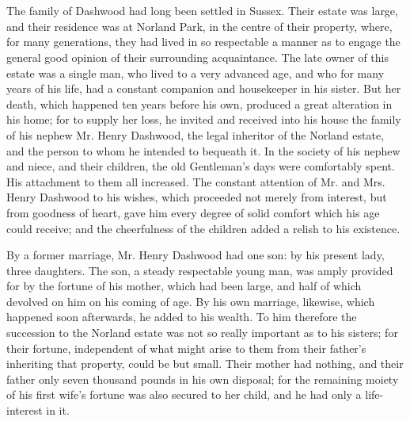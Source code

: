 \chapter{} %

The family of Dashwood had long been settled in Sussex. Their estate was large, and their residence was at Norland Park, in the centre of their property, where, for many generations, they had lived in so respectable a manner as to engage the general good opinion of their surrounding acquaintance. The late owner of this estate was a single man, who lived to a very advanced age, and who for many years of his life, had a constant companion and housekeeper in his sister. But her death, which happened ten years before his own, produced a great alteration in his home; for to supply her loss, he invited and received into his house the family of his nephew Mr. Henry Dashwood, the legal inheritor of the Norland estate, and the person to whom he intended to bequeath it. In the society of his nephew and niece, and their children, the old Gentleman's days were comfortably spent. His attachment to them all increased. The constant attention of Mr. and Mrs. Henry Dashwood to his wishes, which proceeded not merely from interest, but from goodness of heart, gave him every degree of solid comfort which his age could receive; and the cheerfulness of the children added a relish to his existence.

By a former marriage, Mr. Henry Dashwood had one son: by his present lady, three daughters. The son, a steady respectable young man, was amply provided for by the fortune of his mother, which had been large, and half of which devolved on him on his coming of age. By his own marriage, likewise, which happened soon afterwards, he added to his wealth. To him therefore the succession to the Norland estate was not so really important as to his sisters; for their fortune, independent of what might arise to them from their father's inheriting that property, could be but small. Their mother had nothing, and their father only seven thousand pounds in his own disposal; for the remaining moiety of his first wife's fortune was also secured to her child, and he had only a life-interest in it.

